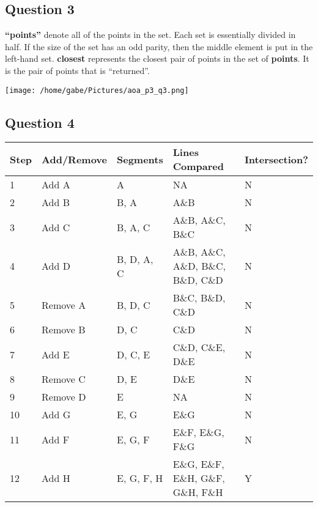 \documentclass[12pt]{article}
\begin{document}
\newpage
\subsection*{Question 3}
\textbf{``points''} denote all of the points in the set. Each set
is essentially divided in half. If the size of the set has an odd parity, then the 
middle element is put in the left-hand set. \textbf{closest} represents the closest
pair of points in the set of \textbf{points}. It is the pair of points that is 
``returned''.

\texttt{[image: /home/gabe/Pictures/aoa\_p3\_q3.png]}

\subsection*{Question 4}
\begin{center}
  \begin{tabular}{ | l | l | l | l | l | }
    \hline
    Step & Add/Remove & Segments   & Lines Compared & Intersection? \\ \hline
    1    & Add A       & A          & NA    & N \\ \hline
		2    & Add B       & B, A       & A\&B    & N \\ \hline
		3    & Add C       & B, A, C    & A\&B, A\&C, B\&C & N \\ \hline
		4    & Add D       & B, D, A, C & A\&B, A\&C, A\&D, B\&C, B\&D, C\&D & N \\ \hline
		5    & Remove A    & B, D, C    & B\&C, B\&D, C\&D & N \\ \hline
		6    & Remove B    & D, C       & C\&D     & N \\ \hline
		7    & Add E       & D, C, E    & C\&D, C\&E, D\&E     & N \\ \hline
		8    & Remove C    & D, E       & D\&E     & N \\ \hline
    9    & Remove D    & E          & NA     & N \\ \hline
		10   & Add G			 & E, G       & E\&G     & N \\ \hline
		11   & Add F			 & E, G, F    & E\&F, E\&G, F\&G     & N \\ \hline
		12   & Add H	  	 & E, G, F, H & E\&G, E\&F, E\&H, G\&F, G\&H, F\&H & Y \\ \hline
  \end{tabular}
\end{center}
\end{document}
